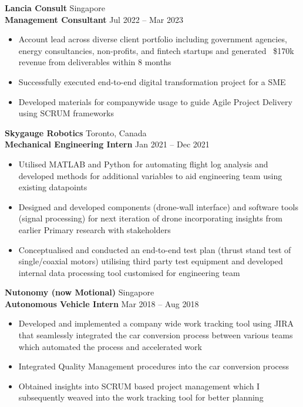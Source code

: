 \documentclass[10t]{article}
\begin{document}
\textbf{Lancia Consult} \hfill Singapore\\
\textbf{Management Consultant} \hfill Jul 2022 -- Mar 2023
\begin{itemize}[noitemsep]
    \item Account lead across diverse client portfolio including government agencies, energy consultancies, non-profits, and fintech startups and generated ~\$170k revenue from deliverables within 8 months
    \item Successfully executed end-to-end digital transformation project for a SME
    \item Developed materials for companywide usage to guide Agile Project Delivery using SCRUM frameworks
\end{itemize}

\textbf{Skygauge Robotics} \hfill Toronto, Canada\\
\textbf{Mechanical Engineering Intern} \hfill Jan 2021 -- Dec 2021
\begin{itemize}[noitemsep]
    \item Utilised MATLAB and Python for automating flight log analysis and developed methods for additional variables to aid engineering team using existing datapoints
    \item Designed and developed components (drone-wall interface) and software tools (signal processing) for next iteration of drone incorporating insights from earlier Primary research with stakeholders
    \item Conceptualised and conducted an end-to-end test plan (thrust stand test of single/coaxial motors) utilising third party test equipment and developed internal data processing tool customised for engineering team
\end{itemize}

\textbf{Nutonomy (now Motional)} \hfill Singapore\\
\textbf{Autonomous Vehicle Intern} \hfill Mar 2018 -- Aug 2018
\begin{itemize}[noitemsep]
    \item Developed and implemented a company wide work tracking tool using JIRA that seamlessly integrated the car conversion process between various teams which automated the process and accelerated work
    \item Integrated Quality Management procedures into the car conversion process
    \item Obtained insights into SCRUM based project management which I subsequently weaved into the work tracking tool for better planning
\end{itemize}
\end{document}
